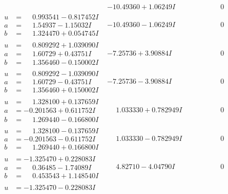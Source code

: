 \documentclass[1p]{elsarticle_modified}
\theoremstyle{definition}
\begin{document}
$$\begin{array}{c|c|c}
 & -10.49360 + 1.06249 I & \phantom{-0.000000 } 0 \\ \hline\begin{aligned}
u &= \phantom{-}0.993541 - 0.817452 I \\
a &= \phantom{-}1.54937 - 1.15032 I \\
b &= \phantom{-}1.324470 + 0.054745 I\end{aligned}
 & -10.49360 - 1.06249 I & \phantom{-0.000000 } 0 \\ \hline\begin{aligned}
u &= \phantom{-}0.809292 + 1.039090 I \\
a &= \phantom{-}1.60729 + 0.43751 I \\
b &= \phantom{-}1.356460 - 0.150002 I\end{aligned}
 & -7.25736 + 3.90884 I & \phantom{-0.000000 } 0 \\ \hline\begin{aligned}
u &= \phantom{-}0.809292 - 1.039090 I \\
a &= \phantom{-}1.60729 - 0.43751 I \\
b &= \phantom{-}1.356460 + 0.150002 I\end{aligned}
 & -7.25736 - 3.90884 I & \phantom{-0.000000 } 0 \\ \hline\begin{aligned}
u &= \phantom{-}1.328100 + 0.137659 I \\
a &= -0.201563 + 0.611752 I \\
b &= \phantom{-}1.269440 - 0.166800 I\end{aligned}
 & \phantom{-}1.033330 + 0.782949 I & \phantom{-0.000000 } 0 \\ \hline\begin{aligned}
u &= \phantom{-}1.328100 - 0.137659 I \\
a &= -0.201563 - 0.611752 I \\
b &= \phantom{-}1.269440 + 0.166800 I\end{aligned}
 & \phantom{-}1.033330 - 0.782949 I & \phantom{-0.000000 } 0 \\ \hline\begin{aligned}
u &= -1.325470 + 0.228083 I \\
a &= \phantom{-}0.36485 - 1.74089 I \\
b &= \phantom{-}0.453543 + 1.148540 I\end{aligned}
 & \phantom{-}4.82710 - 4.04790 I & \phantom{-0.000000 } 0 \\ \hline\begin{aligned}
u &= -1.325470 - 0.228083 I \\

\end{aligned}
\end{array}$$
\end{document}

